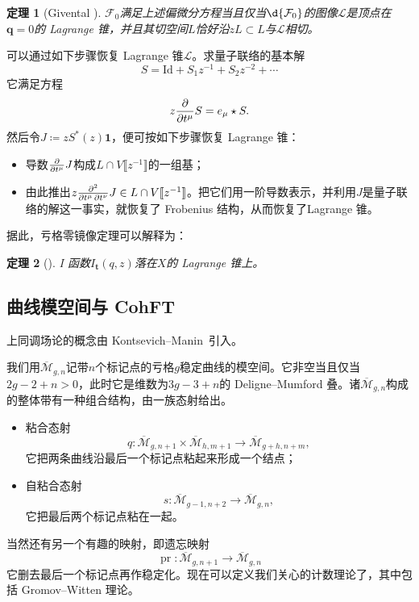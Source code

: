 \documentclass{amsart}
\newtheorem{thm}{定理}[section]
\theoremstyle{definition}
\theoremstyle{remark}
\theoremstyle{plain}
\theoremstyle{definition}
\theoremstyle{remark}
\newcommand{\Mbar}{\overline{\mathcal{M}}}
\newcommand{\mc}[1]{\mathcal{#1}}
\newcommand{\mbf}[1]{\mathbf{#1}}
\newcommand{\bq}{\mbf{q}}
\newcommand{\mr}[1]{\mathrm{#1}}
\newcommand{\1}{\mathbf{1}}
\newcommand{\2}{\mathbf{2}}
\newcommand{\3}{\mathbf{3}}
\newcommand{\ps}[1]{\llbracket #1 \rrbracket}
\DeclareMathOperator{\pr}{pr}
\begin{document}
\begin{thm}[Givental {\cite{Givental2004}}]
    $\mc{F}_0$满足上述偏微分方程当且仅当$\d{\mc{F}_0}$的图像$\mc{L}$是顶点在$\bq = 0$的 Lagrange 锥，并且其切空间$L$恰好沿$zL \subset L$与$\mc{L}$相切。
\end{thm}

可以通过如下步骤恢复 Lagrange 锥$\mc{L}$。求量子联络的基本解
\[ S = \mr{Id} + S_1 z^{-1} + S_2 z^{-2} + \cdots \]
它满足方程
\[ z \pdv{}{t^{\mu}}S = e_{\mu} \star S. \]
然后令$J \coloneqq z S^*(z) \1$，便可按如下步骤恢复 Lagrange 锥：
\begin{itemize}
    \item 导数$\pdv{}{t^{\mu}} J$构成$L \cap V\ps{z^{-1}}$的一组基；
    \item 由此推出$z \pdv{}{t^{\mu},t^{\nu}} J \in L \cap V \ps{z^{-1}}$。把它们用一阶导数表示，并利用$J$是量子联络的解这一事实，就恢复了 Frobenius 结构，从而恢复了Lagrange 锥。
\end{itemize}

据此，亏格零镜像定理可以解释为：
\begin{thm}[{\cite{Givental1998}}]
    I 函数\(I_{\mbf{t}}(q,z)\)落在\(X\)的 Lagrange 锥上。
\end{thm}




\subsection{曲线模空间与 CohFT}%
\label{sub:Moduli of curves and CohFTs}

上同调场论的概念由 Kontsevich--Manin~\cite{KM1994}引入。

我们用$\Mbar_{g,n}$记带$n$个标记点的亏格$g$稳定曲线的模空间。它非空当且仅当$2g-2+n > 0$，此时它是维数为$3g-3+n$的 Deligne--Mumford 叠。诸$\Mbar_{g,n}$构成的整体带有一种组合结构，由一族态射给出。
\begin{itemize}
    \item 粘合态射
        \[q \colon \Mbar_{g,n+1} \times \Mbar_{h, m+1} \to \Mbar_{g+h,n+m}, \] 
        它把两条曲线沿最后一个标记点粘起来形成一个结点；
    \item 自粘合态射\[s \colon \Mbar_{g-1,n+2} \to \Mbar_{g,n},\] 
        它把最后两个标记点粘在一起。
\end{itemize}
当然还有另一个有趣的映射，即遗忘映射
\[ \pr \colon \Mbar_{g,n+1} \to \Mbar_{g,n} \]
它删去最后一个标记点再作稳定化。现在可以定义我们关心的计数理论了，其中包括 Gromov--Witten 理论。
\end{document}
